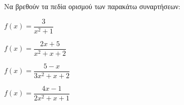 Να βρεθούν τα πεδία ορισμού των παρακάτω συναρτήσεων:
\begin{alist}
\item $ f(x)=\dfrac{3}{x^2+1} $
\item $ f(x)=\dfrac{2x+5}{x^2+x+2} $
\item $ f(x)=\dfrac{5-x}{3x^2+x+2} $
\item $ f(x)=\dfrac{4x-1}{2x^2+x+1} $
\end{alist}
